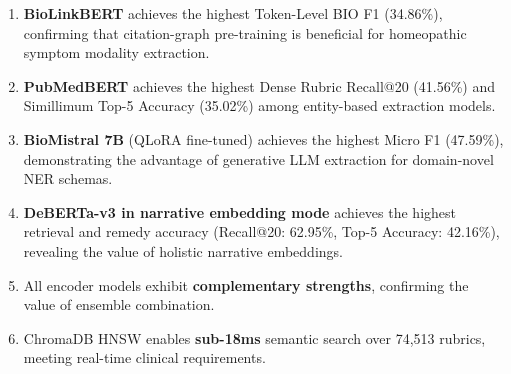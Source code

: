 \begin{enumerate}
  \item \textbf{BioLinkBERT} achieves the highest Token-Level BIO F1 (34.86\%), confirming that citation-graph pre-training is beneficial for homeopathic symptom modality extraction.
  \item \textbf{PubMedBERT} achieves the highest Dense Rubric Recall@20 (41.56\%) and Simillimum Top-5 Accuracy (35.02\%) among entity-based extraction models.
  \item \textbf{BioMistral 7B} (QLoRA fine-tuned) achieves the highest Micro F1 (47.59\%), demonstrating the advantage of generative LLM extraction for domain-novel NER schemas.
  \item \textbf{DeBERTa-v3 in narrative embedding mode} achieves the highest retrieval and remedy accuracy (Recall@20: 62.95\%, Top-5 Accuracy: 42.16\%), revealing the value of holistic narrative embeddings.
  \item All encoder models exhibit \textbf{complementary strengths}, confirming the value of ensemble combination.
  \item ChromaDB HNSW enables \textbf{sub-18ms} semantic search over 74,513 rubrics, meeting real-time clinical requirements.
\end{enumerate}

